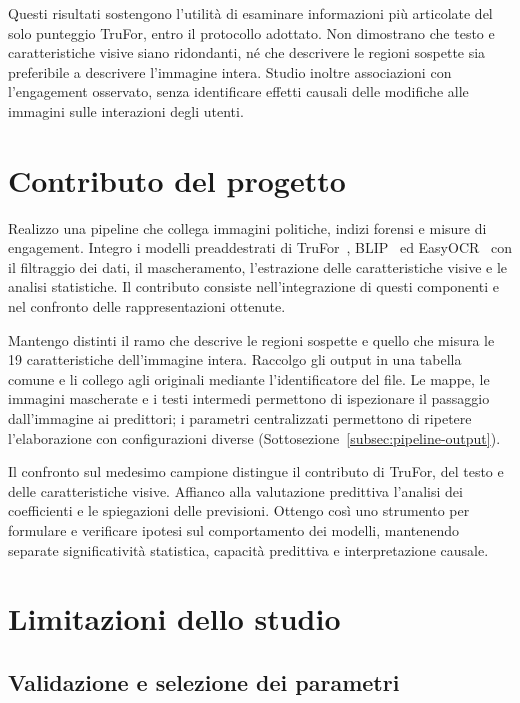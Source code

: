 Questi risultati sostengono l'utilità di esaminare informazioni più articolate del solo punteggio TruFor, entro il protocollo adottato. Non dimostrano che testo e caratteristiche visive siano ridondanti, né che descrivere le regioni sospette sia preferibile a descrivere l'immagine intera. Studio inoltre associazioni con l'engagement osservato, senza identificare effetti causali delle modifiche alle immagini sulle interazioni degli utenti.

\section{Contributo del progetto}
\label{sec:conclusioni-contributo}

Realizzo una pipeline che collega immagini politiche, indizi forensi e misure di engagement. Integro i modelli preaddestrati di TruFor~\cite{Guillaro_2023_CVPR}, BLIP~\cite{pmlr-v162-li22n} ed EasyOCR~\cite{easyocr_software} con il filtraggio dei dati, il mascheramento, l'estrazione delle caratteristiche visive e le analisi statistiche. Il contributo consiste nell'integrazione di questi componenti e nel confronto delle rappresentazioni ottenute.

Mantengo distinti il ramo che descrive le regioni sospette e quello che misura le 19 caratteristiche dell'immagine intera. Raccolgo gli output in una tabella comune e li collego agli originali mediante l'identificatore del file. Le mappe, le immagini mascherate e i testi intermedi permettono di ispezionare il passaggio dall'immagine ai predittori; i parametri centralizzati permettono di ripetere l'elaborazione con configurazioni diverse (Sottosezione~\ref{subsec:pipeline-output}).

Il confronto sul medesimo campione distingue il contributo di TruFor, del testo e delle caratteristiche visive. Affianco alla valutazione predittiva l'analisi dei coefficienti e le spiegazioni delle previsioni. Ottengo così uno strumento per formulare e verificare ipotesi sul comportamento dei modelli, mantenendo separate significatività statistica, capacità predittiva e interpretazione causale.

\section{Limitazioni dello studio}
\label{sec:conclusioni-limitazioni}

\subsection{Validazione e selezione dei parametri}
\label{subsec:limiti-validazione}

